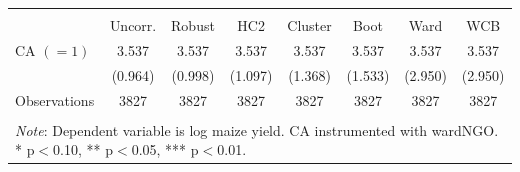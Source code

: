 \begin{tabular}{l*{7}{c}} 
\\[-1.8ex]\hline \hline \\[-1.8ex] 
& \multicolumn{1}{c}{Uncorr.} & 
\multicolumn{1}{c}{Robust} & 
\multicolumn{1}{c}{HC2} & 
\multicolumn{1}{c}{Cluster} & 
\multicolumn{1}{c}{Boot} & 
\multicolumn{1}{c}{Ward} & 
\multicolumn{1}{c}{WCB} 
\\ \midrule
\midrule
\hspace{0.1cm} CA $(=1)$&       3.537\sym{***}&       3.537\sym{***}&       3.537\sym{***}&       3.537\sym{***}&       3.537\sym{**} &       3.537         &       3.537         \\
                    &     (0.964)         &     (0.998)         &     (1.097)         &     (1.368)         &     (1.533)         &     (2.950)         &     (2.950)         \\
\midrule
Observations        &        3827         &        3827         &        3827         &        3827         &        3827         &        3827         &        3827         \\
\hline \hline \\[-1.8ex] 
\multicolumn{8}{p{\linewidth}}{\small 
\noindent \textit{Note}: Dependent variable 
is log maize yield. CA instrumented with 
wardNGO. 
* p$<$0.10, ** p$<$0.05, *** p$<$0.01.} 
\end{tabular}
